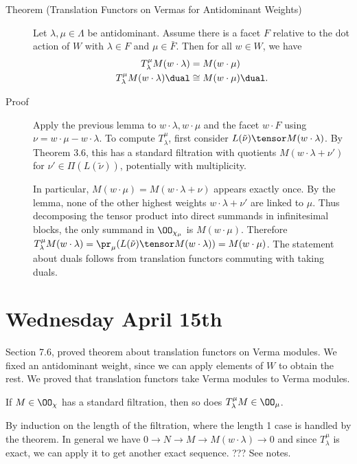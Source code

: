 \begin{description}
\item[Theorem (Translation Functors on Vermas for Antidominant Weights)]
Let \(\lambda, \mu \in \Lambda\) be antidominant. Assume there is a
facet \(F\) relative to the dot action of \(W\) with \(\lambda \in F\)
and \(\mu \in \bar F\). Then for all \(w\in W\), we have \begin{align*}
T_\lambda^\mu M(w\cdot \lambda) &= M(w\cdot \mu) \\
T_\lambda^\mu M(w\cdot \lambda)\dual &\cong M(w\cdot \mu)\dual
.\end{align*}
\item[Proof]
Apply the previous lemma to \(w\cdot \lambda, w\cdot \mu\) and the facet
\(w\cdot F\) using \(\nu = w\cdot \mu - w\cdot \lambda\). To compute
\(T_\lambda^\mu\), first consider
\(L(\tilde \nu) \tensor M(w\cdot \lambda)\). By Theorem 3.6, this has a
standard filtration with quotients \(M(w\cdot \lambda + \nu')\) for
\(\nu' \in \Pi(L(\tilde \nu))\), potentially with multiplicity.

\hfill\break

In particular, \(M(w\cdot \mu) = M(w\cdot \lambda + \nu)\) appears
exactly once. By the lemma, none of the other highest weights
\(w\cdot \lambda + \nu'\) are linked to \(\mu\). Thus decomposing the
tensor product into direct summands in infinitesimal blocks, the only
summand in \(\OO_{\chi_\mu}\) is \(M(w\cdot \mu)\). Therefore
\(T_\lambda^\mu M(w\cdot \lambda) = \pr_\mu (L(\tilde \nu) \tensor M(w\cdot \lambda)) = M(w\cdot \mu)\).
The statement about duals follows from translation functors commuting
with taking duals.
\end{description}

\hypertarget{wednesday-april-15th}{%
\section{Wednesday April 15th}\label{wednesday-april-15th}}

Section 7.6, proved theorem about translation functors on Verma modules.
We fixed an antidominant weight, since we can apply elements of \(W\) to
obtain the rest. We proved that translation functors take Verma modules
to Verma modules.

\begin{description}
\tightlist
\item[Corollary (Translations Have Standard Filtrations)]
If \(M\in \OO_\chi\) has a standard filtration, then so does
\(T_\lambda^\mu M \in \OO_\mu\).
\item[Proof]
By induction on the length of the filtration, where the length 1 case is
handled by the theorem. In general we have
\(0 \to N \to M \to M(w\cdot \lambda) \to 0\) and since
\(T_\lambda^\mu\) is exact, we can apply it to get another exact
sequence. ??? See notes.
\end{description}

